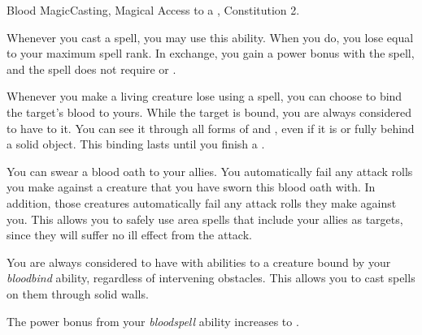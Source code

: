   \begin{magicalfeat}{Blood Magic}{Casting, Magical}
    \featpre Access to a , Constitution 2.

     Whenever you cast a spell, you may use this ability.
    When you do, you lose  equal to your maximum spell rank.
    In exchange, you gain a  power bonus with the spell, and the spell does not require  or .

     Whenever you make a living creature lose  using a spell, you can choose to bind the target's blood to yours.
    While the target is bound, you are always considered to have  to it.
    You can see it through all forms of  and , even if it is  or fully behind a solid object.
    This binding lasts until you finish a .

     You can swear a blood oath to your allies.
    You automatically fail any attack rolls you make against a creature that you have sworn this blood oath with.
    In addition, those creatures automatically fail any attack rolls they make against you.
    This allows you to safely use area spells that include your allies as targets, since they will suffer no ill effect from the attack.

     You are always considered to have  with \magical abilities to a creature bound by your \textit{bloodbind} ability, regardless of intervening obstacles.
    This allows you to cast spells on them through solid walls.

     The power bonus from your \textit{bloodspell} ability increases to .
  \end{magicalfeat}

